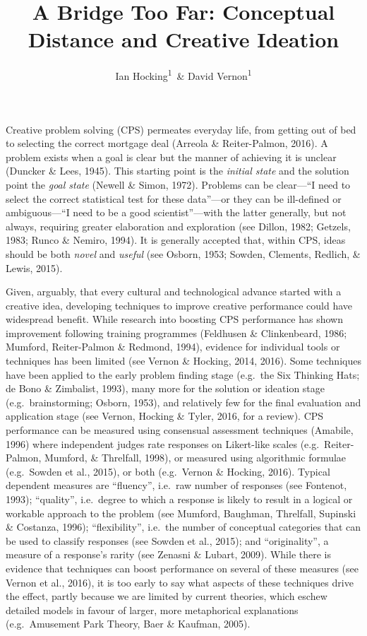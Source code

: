 \documentclass[english,man]{apa6}
\title{A Bridge Too Far: Conceptual Distance and Creative Ideation}
\author{Ian Hocking\textsuperscript{1}~\& David Vernon\textsuperscript{1}}
\affiliation{
    \vspace{0.5cm}
          \textsuperscript{1} Canterbury Christ Church University  }
\begin{document}
\maketitle



Creative problem solving (CPS) permeates everyday life, from getting out
of bed to selecting the correct mortgage deal (Arreola \& Reiter-Palmon,
2016). A problem exists when a goal is clear but the manner of achieving
it is unclear (Duncker \& Lees, 1945). This starting point is the
\emph{initial state} and the solution point the \emph{goal state}
(Newell \& Simon, 1972). Problems can be clear---\enquote{I need to
select the correct statistical test for these data}---or they can be
ill-defined or ambiguous---\enquote{I need to be a good
scientist}---with the latter generally, but not always, requiring
greater elaboration and exploration (see Dillon, 1982; Getzels, 1983;
Runco \& Nemiro, 1994). It is generally accepted that, within CPS, ideas
should be both \emph{novel} and \emph{useful} (see Osborn, 1953; Sowden,
Clements, Redlich, \& Lewis, 2015).

Given, arguably, that every cultural and technological advance started
with a creative idea, developing techniques to improve creative
performance could have widespread benefit. While research into boosting
CPS performance has shown improvement following training programmes
(Feldhusen \& Clinkenbeard, 1986; Mumford, Reiter-Palmon \& Redmond,
1994), evidence for individual tools or techniques has been limited (see
Vernon \& Hocking, 2014, 2016). Some techniques have been applied to the
early problem finding stage (e.g.~the Six Thinking Hats; de Bono \&
Zimbalist, 1993), many more for the solution or ideation stage
(e.g.~brainstorming; Osborn, 1953), and relatively few for the final
evaluation and application stage (see Vernon, Hocking \& Tyler, 2016,
for a review). CPS performance can be measured using consensual
assessment techniques (Amabile, 1996) where independent judges rate
responses on Likert-like scales (e.g.~Reiter-Palmon, Mumford, \&
Threlfall, 1998), or measured using algorithmic formulae (e.g.~Sowden et
al., 2015), or both (e.g.~Vernon \& Hocking, 2016). Typical dependent
measures are \enquote{fluency}, i.e.~raw number of responses (see
Fontenot, 1993); \enquote{quality}, i.e.~degree to which a response is
likely to result in a logical or workable approach to the problem (see
Mumford, Baughman, Threlfall, Supinski \& Costanza, 1996);
\enquote{flexibility}, i.e.~the number of conceptual categories that can
be used to classify responses (see Sowden et al., 2015); and
\enquote{originality}, a measure of a response's rarity (see Zenasni \&
Lubart, 2009). While there is evidence that techniques can boost
performance on several of these measures (see Vernon et al., 2016), it
is too early to say what aspects of these techniques drive the effect,
partly because we are limited by current theories, which eschew detailed
models in favour of larger, more metaphorical explanations
(e.g.~Amusement Park Theory, Baer \& Kaufman, 2005).
\end{document}
